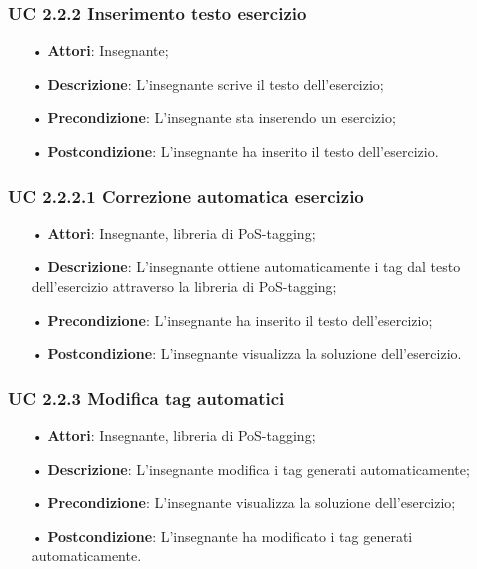\subsubsection{UC 2.2.2 Inserimento testo esercizio}

\begin{itemize}
	\item[•] \textbf{Attori}: Insegnante;
	\item[•] \textbf{Descrizione}: L'insegnante scrive il testo dell’esercizio;
	\item[•] \textbf{Precondizione}: L'insegnante sta inserendo un esercizio;
	\item[•] \textbf{Postcondizione}: L'insegnante ha inserito il testo dell'esercizio.
\end{itemize}

\subsubsection{UC 2.2.2.1 Correzione automatica esercizio}
\begin{itemize}
	\item[•] \textbf{Attori}: Insegnante, libreria di PoS-tagging;
	\item[•] \textbf{Descrizione}: L’insegnante ottiene automaticamente i tag dal testo dell’esercizio attraverso la libreria di PoS-tagging;
	\item[•] \textbf{Precondizione}: L'insegnante ha inserito il testo dell'esercizio;
	\item[•] \textbf{Postcondizione}: L'insegnante visualizza la soluzione dell'esercizio.
\end{itemize}

\subsubsection{UC 2.2.3 Modifica tag automatici}
\begin{itemize}
	\item[•] \textbf{Attori}: Insegnante, libreria di PoS-tagging;
	\item[•] \textbf{Descrizione}: L’insegnante modifica i tag generati automaticamente;
	\item[•] \textbf{Precondizione}: L'insegnante visualizza la soluzione dell'esercizio;
	\item[•] \textbf{Postcondizione}: L'insegnante ha modificato i tag generati automaticamente.
\end{itemize}


